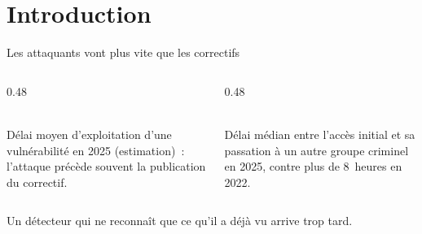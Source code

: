 \section{Introduction}

\begin{frame}{Les attaquants vont plus vite que les correctifs}
  \begin{columns}[T]
    \begin{column}{0.48\textwidth}
      \begin{carte}[height=3.6cm,valign=top]
        \\[0.25cm]
        Délai moyen d'exploitation d'une vulnérabilité en 2025 (estimation)~: l'attaque
        précède souvent la publication du correctif.
      \end{carte}
    \end{column}
    \begin{column}{0.48\textwidth}
      \begin{carte}[height=3.6cm,valign=top]
        \\[0.25cm]
        Délai médian entre l'accès initial et sa passation à un autre groupe criminel
        en 2025, contre plus de 8~heures en 2022.
      \end{carte}
    \end{column}
  \end{columns}
  \vspace{0.45cm}
  \begin{pointcle}
    \centering\large
    Un détecteur qui ne reconnaît que ce qu'il a déjà vu arrive trop tard.
  \end{pointcle}
\end{frame}

